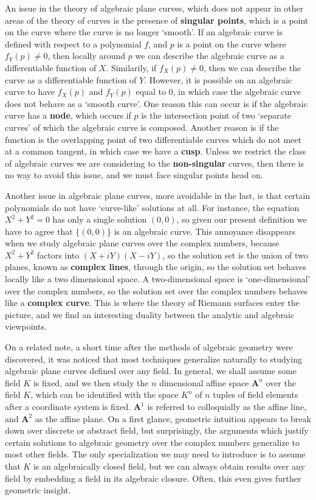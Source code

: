 An issue in the theory of algebraic plane curves, which does not appear in other areas of the theory of curves is the presence of {\bf singular points}, which is a point on the curve where the curve is no longer `smooth'. If an algebraic curve is defined with respect to a polynomial $f$, and $p$ is a point on the curve where $f_Y(p) \neq 0$, then locally around $p$ we can describe the algebraic curve as a differentiable function of $X$. Similarily, if $f_X(p) \neq 0$, then we can describe the curve as a differentiable function of $Y$. However, it is possible on an algebraic curve to have $f_X(p)$ and $f_Y(p)$ equal to 0, in which case the algebraic curve does not behave as a `smooth curve'. One reason this can occur is if the algebraic curve has a {\bf node}, which occurs if $p$ is the intersection point of two `separate curves' of which the algebraic curve is composed. Another reason is if the function is the overlapping point of two differentiable curves which do not meet at a common tangent, in which case we have a {\bf cusp}. Unless we restrict the class of algebraic curves we are considering to the {\bf non-singular} curves, then there is no way to avoid this issue, and we must face singular points head on.

Another issue in algebraic plane curves, more avoidable in the last, is that certain polynomials do not have `curve-like' solutions at all. For instance, the equation $X^2 + Y^2 = 0$ has only a single solution $(0,0)$, so given our present definition we have to agree that $\{ (0,0) \}$ is an algebraic curve. This annoyance disappears when we study algebraic plane curves over the complex numbers, because $X^2 + Y^2$ factors into $(X + iY)(X - iY)$, so the solution set is the union of two planes, known as {\bf complex lines}, through the origin, so the solution set behaves locally like a two dimensional space. A two-dimensional space is `one-dimensional' over the complex numbers, so the solution set over the complex numbers behaves like a {\bf complex curve}. This is where the theory of Riemann surfaces enter the picture, and we find an interesting duality between the analytic and algebraic viewpoints.

On a related note, a short time after the methods of algebraic geometry were discovered, it was noticed that most techniques generalize naturally to studying algebraic plane curves defined over any field. In general, we shall assume some field $K$ is fixed, and we then study the $n$ dimensional affine space $\mathbf{A}^n$ over the field $K$, which can be identified with the space $K^n$ of $n$ tuples of field elements after a coordinate system is fixed. $\mathbf{A}^1$ is referred to colloquially as the affine line, and $\mathbf{A}^2$ as the affine plane. On a first glance, geometric intuition appears to break down over discrete or abstract field, but surprisingly, the arguments which justify certain solutions to algebraic geometry over the complex numbers generalize to most other fields. The only specialization we may need to introduce is to assume that $K$ is an algebraically closed field, but we can always obtain results over any field by embedding a field in its algebraic closure. Often, this even gives further geometric insight.

